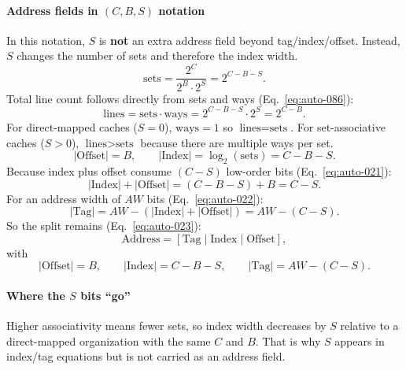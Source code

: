 

\paragraph{Address fields in $(C,B,S)$ notation}\label{par:auto-012}
In this notation, $S$ is \textbf{not} an extra address field beyond tag/index/offset.
Instead, $S$ changes the number of sets and therefore the index width.
\begin{equation}\label{eq:auto-019}
    \text{sets}=\frac{2^C}{2^B\cdot 2^S}=2^{C-B-S}.
\end{equation}
Total line count follows directly from sets and ways (Eq.~\eqref{eq:auto-086}):
\begin{equation}\label{eq:auto-086}
    \text{lines}=\text{sets}\cdot\text{ways}=2^{C-B-S}\cdot 2^S=2^{C-B}.
\end{equation}
For direct-mapped caches ($S=0$), $\text{ways}=1$ so $\text{lines}=\text{sets}$.
For set-associative caches ($S>0$), $\text{lines}>\text{sets}$ because there are multiple ways per set.
\begin{equation}\label{eq:auto-020}
    |\text{Offset}|=B,\qquad
    |\text{Index}|=\log_2(\text{sets})=C-B-S.
\end{equation}
Because index plus offset consume $(C-S)$ low-order bits (Eq.~\eqref{eq:auto-021}):
\begin{equation}\label{eq:auto-021}
    |\text{Index}|+|\text{Offset}|=(C-B-S)+B=C-S.
\end{equation}
For an address width of $AW$ bits (Eq.~\eqref{eq:auto-022}):
\begin{equation}\label{eq:auto-022}
    |\text{Tag}|=AW-(|\text{Index}|+|\text{Offset}|)=AW-(C-S).
\end{equation}
So the split remains (Eq.~\eqref{eq:auto-023}):
\begin{equation}\label{eq:auto-023}
    \text{Address}=[\text{Tag}\mid\text{Index}\mid\text{Offset}],
\end{equation}
with
\begin{equation}\label{eq:auto-024}
    |\text{Offset}|=B,\qquad |\text{Index}|=C-B-S,\qquad |\text{Tag}|=AW-(C-S).
\end{equation}

\paragraph{Where the $S$ bits ``go''}\label{par:auto-013}
Higher associativity means fewer sets, so index width decreases by $S$ relative to a direct-mapped organization with the same $C$ and $B$.
That is why $S$ appears in index/tag equations but is not carried as an address field.


